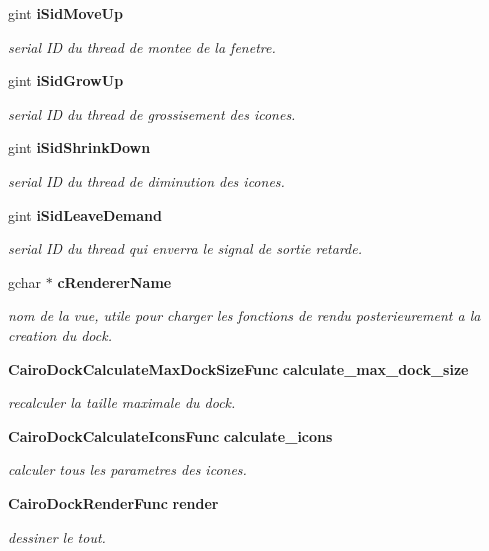 \begin{CompactItemize}
gint {\bf iSidMoveUp}
\begin{CompactList}\small\item\em serial ID du thread de montee de la fenetre. \item\end{CompactList}\item 
gint {\bf iSidGrowUp}
\begin{CompactList}\small\item\em serial ID du thread de grossisement des icones. \item\end{CompactList}\item 
gint {\bf iSidShrinkDown}
\begin{CompactList}\small\item\em serial ID du thread de diminution des icones. \item\end{CompactList}\item 
gint {\bf iSidLeaveDemand}
\begin{CompactList}\small\item\em serial ID du thread qui enverra le signal de sortie retarde. \item\end{CompactList}\item 
gchar $\ast$ {\bf cRendererName}
\begin{CompactList}\small\item\em nom de la vue, utile pour charger les fonctions de rendu posterieurement a la creation du dock. \item\end{CompactList}\item 
{\bf CairoDockCalculateMaxDockSizeFunc} {\bf calculate\_\-max\_\-dock\_\-size}
\begin{CompactList}\small\item\em recalculer la taille maximale du dock. \item\end{CompactList}\item 
{\bf CairoDockCalculateIconsFunc} {\bf calculate\_\-icons}
\begin{CompactList}\small\item\em calculer tous les parametres des icones. \item\end{CompactList}\item 
{\bf CairoDockRenderFunc} {\bf render}
\begin{CompactList}\small\item\em dessiner le tout. \item\end{CompactList}\item 

\end{CompactItemize}
